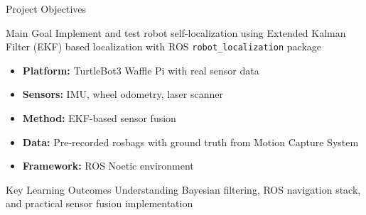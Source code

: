 \documentclass[10pt]{beamer}
\begin{document}
\begin{frame}{Project Objectives}
\begin{block}{Main Goal}
Implement and test robot self-localization using Extended Kalman Filter (EKF) based localization with ROS \texttt{robot\_localization} package
\end{block}

\begin{itemize}
    \item \textbf{Platform:} TurtleBot3 Waffle Pi with real sensor data
    \item \textbf{Sensors:} IMU, wheel odometry, laser scanner
    \item \textbf{Method:} EKF-based sensor fusion
    \item \textbf{Data:} Pre-recorded rosbags with ground truth from Motion Capture System
    \item \textbf{Framework:} ROS Noetic environment
\end{itemize}

\begin{alertblock}{Key Learning Outcomes}
Understanding Bayesian filtering, ROS navigation stack, and practical sensor fusion implementation
\end{alertblock}
\end{frame}
\end{document}
